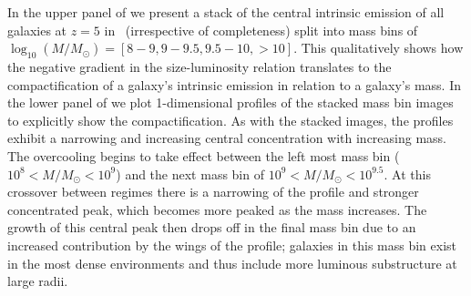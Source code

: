 In the upper panel of  we present a stack of the central intrinsic emission of all galaxies at $z=5$ in \flares\ (irrespective of completeness) split into mass bins of $\log_{10}(M/M_\odot)=[8-9, 9-9.5, 9.5-10, >10]$. This qualitatively shows how the negative gradient in the size-luminosity relation translates to the compactification of a galaxy's intrinsic emission in relation to a galaxy's mass. In the lower panel of  we plot 1-dimensional profiles of the stacked mass bin images to explicitly show the compactification. As with the stacked images, the profiles exhibit a narrowing and increasing central concentration with increasing mass. The overcooling begins to take effect between the left most mass bin ($10^{8}<M/M_\odot<10^{9}$) and the next mass bin of $10^{9}<M/M_\odot<10^{9.5}$. At this crossover between regimes there is a narrowing of the profile and stronger concentrated peak, which becomes more peaked as the mass increases. The growth of this central peak then drops off in the final mass bin due to an increased contribution by the wings of the profile; galaxies in this mass bin exist in the most dense environments and thus include more luminous substructure at large radii.






